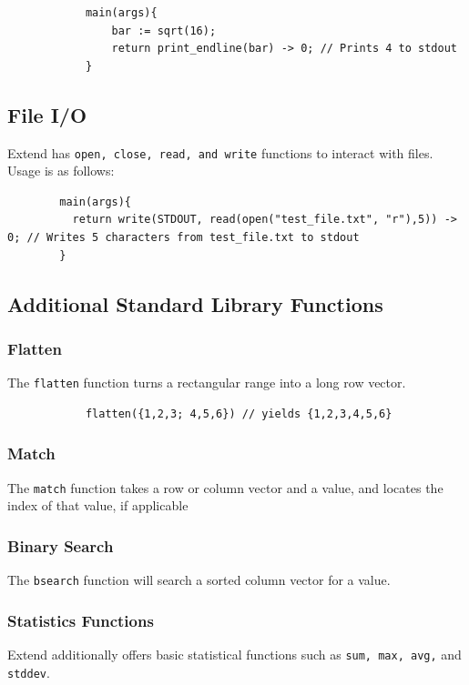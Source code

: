 		\begin{lstlisting}
			main(args){
				bar := sqrt(16);
				return print_endline(bar) -> 0; // Prints 4 to stdout
			}
		\end{lstlisting}

	\subsection{File I/O}
	Extend has \texttt{open, close, read, and write} functions to interact with files. Usage is as follows:

	\begin{lstlisting}
		main(args){
		  return write(STDOUT, read(open("test_file.txt", "r"),5)) -> 0; // Writes 5 characters from test_file.txt to stdout
		}
	\end{lstlisting}

	\subsection{Additional Standard Library Functions}

		\subsubsection{Flatten}
		The \texttt{flatten} function turns a rectangular range into a long row vector.

		\begin{lstlisting}
			flatten({1,2,3; 4,5,6}) // yields {1,2,3,4,5,6}
		\end{lstlisting}

		\subsubsection{Match}
		The \texttt{match} function takes a row or column vector and a value, and locates the index of that value, if applicable

		\subsubsection{Binary Search}
		The \texttt{bsearch} function will search a sorted column vector for a value.

		\subsubsection{Statistics Functions}
		Extend additionally offers basic statistical functions such as \texttt{sum, max, avg,} and \texttt{stddev}.

